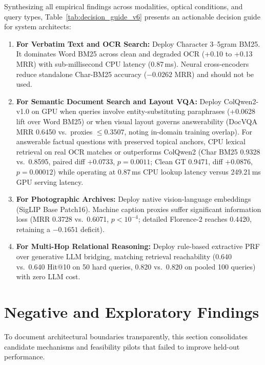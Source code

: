 Synthesizing all empirical findings across modalities, optical conditions, and query types, Table~\ref{tab:decision_guide_v6} presents an actionable decision guide for system architects:
\begin{enumerate}
    \setlength{\itemsep}{0.2pt plus 0.1pt}
    \setlength{\parskip}{0pt}
    \item \textbf{For Verbatim Text and OCR Search:} Deploy Character 3--5gram BM25. It dominates Word BM25 across clean and degraded OCR (+0.10 to +0.13 MRR) with sub-millisecond CPU latency (0.87\,ms). Neural cross-encoders reduce standalone Char-BM25 accuracy ($-0.0262$ MRR) and should not be used.
    \item \textbf{For Semantic Document Search and Layout VQA:} Deploy ColQwen2-v1.0 on GPU when queries involve entity-substituting paraphrases (+0.0628 lift over Word BM25) or when visual layout governs answerability (DocVQA MRR 0.6450 vs.\ proxies $\le 0.3507$, noting in-domain training overlap). For answerable factual questions with preserved topical anchors, CPU lexical retrieval on real OCR matches or outperforms ColQwen2 (Char BM25 0.9328 vs.\ 0.8595, paired diff $+0.0733$, $p = 0.0011$; Clean GT 0.9471, diff $+0.0876$, $p=0.00012$) while operating at 0.87\,ms CPU lookup latency versus 249.21\,ms GPU serving latency.
    \item \textbf{For Photographic Archives:} Deploy native vision-language embeddings (SigLIP Base Patch16). Machine caption proxies suffer significant information loss (MRR 0.3728 vs.\ 0.6071, $p < 10^{-4}$; detailed Florence-2 reaches 0.4420, retaining a $-0.1651$ deficit).
    \item \textbf{For Multi-Hop Relational Reasoning:} Deploy rule-based extractive PRF over generative LLM bridging, matching retrieval reachability (0.640 vs.\ 0.640 Hit@10 on 50 hard queries, 0.820 vs.\ 0.820 on pooled 100 queries) with zero LLM cost.
\end{enumerate}

\section{Negative and Exploratory Findings}
\label{sec:negative_findings}

To document architectural boundaries transparently, this section consolidates candidate mechanisms and feasibility pilots that failed to improve held-out performance.

